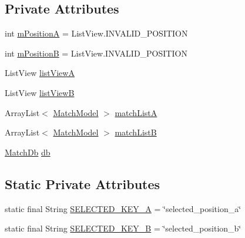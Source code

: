 \subsection*{Private Attributes}
\begin{DoxyCompactItemize}
\item 
int \hyperlink{classorg_1_1buildmlearn_1_1toolkit_1_1matchtemplate_1_1fragment_1_1DetailFragment_a62b242110cc97e1eadf3c62479d6ea05}{m\+PositionA} = List\+View.\+I\+N\+V\+A\+L\+I\+D\+\_\+\+P\+O\+S\+I\+T\+I\+ON
\item 
int \hyperlink{classorg_1_1buildmlearn_1_1toolkit_1_1matchtemplate_1_1fragment_1_1DetailFragment_a59114e949e890662e98ce7c4c04d8b0c}{m\+PositionB} = List\+View.\+I\+N\+V\+A\+L\+I\+D\+\_\+\+P\+O\+S\+I\+T\+I\+ON
\item 
List\+View \hyperlink{classorg_1_1buildmlearn_1_1toolkit_1_1matchtemplate_1_1fragment_1_1DetailFragment_a49d9717a57cd8e991554f52d63648b9b}{list\+ViewA}
\item 
List\+View \hyperlink{classorg_1_1buildmlearn_1_1toolkit_1_1matchtemplate_1_1fragment_1_1DetailFragment_a3805c8bfbaad96b3b5c2a07420e9636c}{list\+ViewB}
\item 
Array\+List$<$ \hyperlink{classorg_1_1buildmlearn_1_1toolkit_1_1matchtemplate_1_1data_1_1MatchModel}{Match\+Model} $>$ \hyperlink{classorg_1_1buildmlearn_1_1toolkit_1_1matchtemplate_1_1fragment_1_1DetailFragment_a89625983c1366b4ab45e46a73f1c2e6b}{match\+ListA}
\item 
Array\+List$<$ \hyperlink{classorg_1_1buildmlearn_1_1toolkit_1_1matchtemplate_1_1data_1_1MatchModel}{Match\+Model} $>$ \hyperlink{classorg_1_1buildmlearn_1_1toolkit_1_1matchtemplate_1_1fragment_1_1DetailFragment_aaed92fe9602401d17062747855707c01}{match\+ListB}
\item 
\hyperlink{classorg_1_1buildmlearn_1_1toolkit_1_1matchtemplate_1_1data_1_1MatchDb}{Match\+Db} \hyperlink{classorg_1_1buildmlearn_1_1toolkit_1_1matchtemplate_1_1fragment_1_1DetailFragment_a936e399d2152581058c0d80051e91ca9}{db}
\end{DoxyCompactItemize}
\subsection*{Static Private Attributes}
\begin{DoxyCompactItemize}
\item 
static final String \hyperlink{classorg_1_1buildmlearn_1_1toolkit_1_1matchtemplate_1_1fragment_1_1DetailFragment_a199bf8fc5f2b1daa8a9f00e251262a56}{S\+E\+L\+E\+C\+T\+E\+D\+\_\+\+K\+E\+Y\+\_\+A} = \char`\"{}selected\+\_\+position\+\_\+a\char`\"{}
\item 
static final String \hyperlink{classorg_1_1buildmlearn_1_1toolkit_1_1matchtemplate_1_1fragment_1_1DetailFragment_a78671b094425c1174bfb14f43af55f3b}{S\+E\+L\+E\+C\+T\+E\+D\+\_\+\+K\+E\+Y\+\_\+B} = \char`\"{}selected\+\_\+position\+\_\+b\char`\"{}
\end{DoxyCompactItemize}


